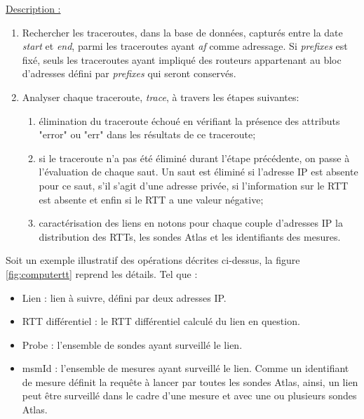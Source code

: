       \underline{Description : }
      \begin{enumerate}
      	\item Rechercher les traceroutes, dans la base de données, capturés entre la date \textit{start} et \textit{end}, parmi les traceroutes ayant \textit{af} comme adressage. Si \textit{prefixes} est fixé, seuls les traceroutes ayant  impliqué des routeurs appartenant au bloc d'adresses défini par \textit{prefixes} qui seront conservés.
      	
      	\item Analyser chaque traceroute, \textit{trace}, à travers les étapes suivantes: 
      	\begin{enumerate}
      		\item élimination du traceroute échoué en vérifiant la présence des attributs "error" ou "err" dans les résultats de ce traceroute;
      		
      		\item si le traceroute n'a pas été éliminé durant l'étape précédente, on passe à l'évaluation de chaque saut. Un saut est éliminé si l'adresse IP est absente pour ce saut, s'il s'agit d'une adresse privée, si l'information sur le RTT est absente et enfin si le RTT a une valeur négative;
      		
      		\item caractérisation des liens en notons pour chaque couple d'adresses IP la distribution des RTTs, les sondes  Atlas et les identifiants des mesures. 
      	\end{enumerate}
      \end{enumerate}
      
   Soit un exemple illustratif des opérations décrites ci-dessus, la figure   \ref{fig:computertt} reprend les détails. Tel que :
   
   \begin{itemize}
   	\item Lien : lien à suivre, défini par deux adresses IP.
   	\item RTT différentiel : le RTT différentiel calculé du lien en question.
   	\item Probe : l'ensemble de sondes ayant surveillé le lien.
   	\item msmId : l'ensemble de mesures ayant surveillé le lien. Comme un identifiant de mesure définit la requête à lancer par toutes les sondes Atlas, ainsi, un lien peut être surveillé dans le cadre d'une mesure et avec une ou plusieurs sondes Atlas.
   \end{itemize}
   
